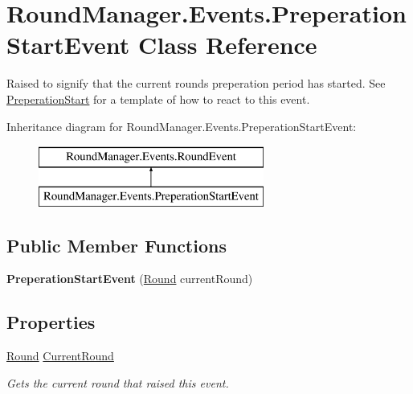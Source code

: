 \hypertarget{class_round_manager_1_1_events_1_1_preperation_start_event}{}\section{Round\+Manager.\+Events.\+Preperation\+Start\+Event Class Reference}
\label{class_round_manager_1_1_events_1_1_preperation_start_event}


Raised to signify that the current rounds preperation period has started. See \hyperlink{class_round_manager_1_1_preperation_start}{Preperation\+Start} for a template of how to react to this event.  


Inheritance diagram for Round\+Manager.\+Events.\+Preperation\+Start\+Event\+:\begin{figure}[H]
\begin{center}
\leavevmode
\includegraphics[height=2.000000cm]{class_round_manager_1_1_events_1_1_preperation_start_event}
\end{center}
\end{figure}
\subsection*{Public Member Functions}
\begin{DoxyCompactItemize}
\item 
\hypertarget{class_round_manager_1_1_events_1_1_preperation_start_event_ab9227280fc7a36fc1c1f5c7da48a27a0}{}{\bfseries Preperation\+Start\+Event} (\hyperlink{class_round_manager_1_1_round}{Round} current\+Round)\label{class_round_manager_1_1_events_1_1_preperation_start_event_ab9227280fc7a36fc1c1f5c7da48a27a0}

\end{DoxyCompactItemize}
\subsection*{Properties}
\begin{DoxyCompactItemize}
\item 
\hyperlink{class_round_manager_1_1_round}{Round} \hyperlink{class_round_manager_1_1_events_1_1_preperation_start_event_a0636c13306d39f6bcf5bde157012334e}{Current\+Round}
\begin{DoxyCompactList}\small\item\em Gets the current round that raised this event. \end{DoxyCompactList}\end{DoxyCompactItemize}


